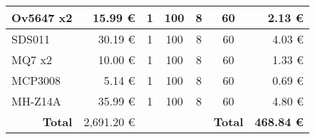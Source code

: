 \begin{table}[H]
{\begin{tabular}{l|r|cccc|r|}
      \multicolumn{1}{|l|}{Ov5647 x2}              & 15.99 €                                                     & \multicolumn{1}{c|}{1}                 & \multicolumn{1}{c|}{100}                                    & \multicolumn{1}{c|}{8}                                      & 60                                     & 2.13 €                                                      \\ \hline
      \multicolumn{1}{|l|}{SDS011}                 & 30.19 €                                                     & \multicolumn{1}{c|}{1}                 & \multicolumn{1}{c|}{100}                                    & \multicolumn{1}{c|}{8}                                      & 60                                     & 4.03 €                                                      \\ \hline
      \multicolumn{1}{|l|}{MQ7 x2}                 & 10.00 €                                                     & \multicolumn{1}{c|}{1}                 & \multicolumn{1}{c|}{100}                                    & \multicolumn{1}{c|}{8}                                      & 60                                     & 1.33 €                                                      \\ \hline
      \multicolumn{1}{|l|}{MCP3008}                & 5.14 €                                                      & \multicolumn{1}{c|}{1}                 & \multicolumn{1}{c|}{100}                                    & \multicolumn{1}{c|}{8}                                      & 60                                     & 0.69 €                                                      \\ \hline
      \multicolumn{1}{|l|}{MH-Z14A}                & 35.99 €                                                     & \multicolumn{1}{c|}{1}                 & \multicolumn{1}{c|}{100}                                    & \multicolumn{1}{c|}{8}                                      & 60                                     & 4.80 €                                                      \\ \hline
      \multicolumn{1}{r|}{\textbf{Total}}          & 2,691.20 €                                                  & \multicolumn{1}{l}{}                   & \multicolumn{1}{l}{}                                        & \multicolumn{1}{l}{}                                        & \multicolumn{1}{r|}{\textbf{Total}}    & \textbf{468.84 €}                                           \\ \cline{2-2} \cline{7-7}
    \end{tabular}%
  }
\end{table}


